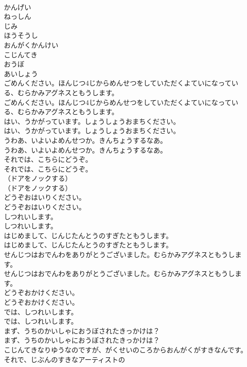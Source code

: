 \documentclass[8pt]{extreport}
\begin{document}
\begin{CJK}{UTF8}{min}
\\	かんげい
\\	ねっしん
\\	じみ
\\	ほうそうし
\\	おんがくかんけい
\\	こじんてき
\\	おうぼ
\\	あいしょう
\\	ごめんください。ほんじつ4じからめんせつをしていただくよていになっている、むらかみアグネスともうします。
\\	ごめんください。ほんじつ4じからめんせつをしていただくよていになっている、むらかみアグネスともうします。
\\	はい、うかがっています。しょうしょうおまちください。
\\	はい、うかがっています。しょうしょうおまちください。
\\	うわあ、いよいよめんせつか。きんちょうするなあ。
\\	うわあ、いよいよめんせつか。きんちょうするなあ。
\\	それでは、こちらにどうぞ。
\\	それでは、こちらにどうぞ。
\\	（ドアをノックする）
\\	（ドアをノックする）
\\	どうぞおはいりください。
\\	どうぞおはいりください。
\\	しつれいします。
\\	しつれいします。
\\	はじめまして、じんじたんとうのすぎたともうします。
\\	はじめまして、じんじたんとうのすぎたともうします。
\\	せんじつはおでんわをありがとうございました。むらかみアグネスともうします。
\\	せんじつはおでんわをありがとうございました。むらかみアグネスともうします。
\\	どうぞおかけください。
\\	どうぞおかけください。
\\	では、しつれいします。
\\	では、しつれいします。
\\	まず、うちのかいしゃにおうぼされたきっかけは？
\\	まず、うちのかいしゃにおうぼされたきっかけは？
\\	こじんてきなりゆうなのですが、がくせいのころからおんがくがすきなんです。それで、じぶんのすきなアーティストの

\end{CJK}
\end{document}

